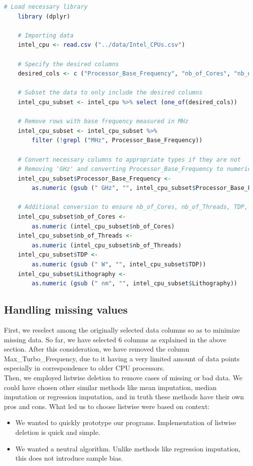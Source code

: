 \begin{lstlisting}[language=R]
    # Load necessary library
    library (dplyr)

    # Importing data
    intel_cpu <- read.csv ("../data/Intel_CPUs.csv")

    # Specify the desired columns
    desired_cols <- c ("Processor_Base_Frequency", "nb_of_Cores", "nb_of_Threads", "TDP", "Lithography")

    # Subset the data to only include the desired columns
    intel_cpu_subset <- intel_cpu %>% select (one_of(desired_cols))

    # Remove rows with base frequency measured in MHz
    intel_cpu_subset <- intel_cpu_subset %>%
        filter (!grepl ("MHz", Processor_Base_Frequency))

    # Convert necessary columns to appropriate types if they are not
    # Removing 'GHz' and converting Processor_Base_Frequency to numeric
    intel_cpu_subset$Processor_Base_Frequency <- 
        as.numeric (gsub (" GHz", "", intel_cpu_subset$Processor_Base_Frequency))

    # Additional conversion to ensure nb_of_Cores, nb_of_Threads, TDP, and Lithography are numeric where applicable
    intel_cpu_subset$nb_of_Cores <- 
        as.numeric (intel_cpu_subset$nb_of_Cores)
    intel_cpu_subset$nb_of_Threads <- 
        as.numeric (intel_cpu_subset$nb_of_Threads)
    intel_cpu_subset$TDP <- 
        as.numeric (gsub (" W", "", intel_cpu_subset$TDP))
    intel_cpu_subset$Lithography <- 
        as.numeric (gsub (" nm", "", intel_cpu_subset$Lithography))

\end{lstlisting}

\vspace*{1cm}

\subsection{Handling missing values}

First, we reselect among the originally selected data columns so as to minimize missing data. So far, we have selected 6 columns as explained in the above section. After this consideration, we have removed the column Max\_Turbo\_Frequency, due to it having a very limited amount of data points especially in correspondence to older CPU processors.\\

Then, we employed listwise deletion to remove cases of missing or bad data. We could have chosen other similar methods like mean imputation, median imputation or regression imputation, and in truth these methods have their own pros and cons. What led us to choose listwise were based on context:
\begin{itemize}
    \item We wanted to quickly prototype our programs. Implementation of listwise deletion is quick and simple.
    \item We wanted a neutral algorithm. Unlike methods like regression imputation, this does not introduce sample bias.
\end{itemize}

